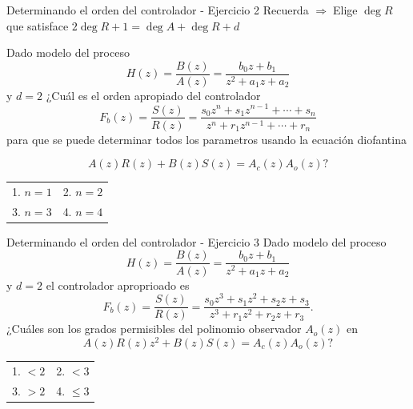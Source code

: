 \documentclass[presentation,aspectratio=169]{beamer}
\begin{document}
\begin{frame}[label={sec:orgabaf6a2}]{Determinando el orden del controlador - Ejercicio 2}
Recuerda    \alert{\(\Rightarrow\;\)Elige \(\deg R\) que satisface \(2\deg R + 1 = \deg A + \deg R + d\)}

   Dado modelo del proceso \[H(z) = \frac{B(z)}{A(z)} = \frac{b_0z + b_1}{z^2 + a_1z + a_2}\] y \(d=2\)  ¿Cuál es el orden apropiado del controlador 
\[F_b(z) = \frac{S(z)}{R(z)} = \frac{s_0z^n + s_1z^{n-1} + \cdots + s_n}{z^n + r_1 z^{n-1} + \cdots + r_n}\]
para que se puede determinar todos los parametros usando la ecuación diofantina

\[ A(z)R(z) + B(z)S(z) = A_c(z)A_o(z)?\]

\begin{center}
\begin{tabular}{ll}
1. \(n = 1\) & 2. \(n = 2\)\\
3. \(n=3\) & 4. \(n=4\)\\
\end{tabular}
\end{center}
\end{frame}

\begin{frame}[label={sec:org73ebcfa}]{Determinando el orden del controlador - Ejercicio 3}
   Dado modelo del proceso \[H(z) = \frac{B(z)}{A(z)} = \frac{b_0z + b_1}{z^2 + a_1z + a_2}\] y \(d=2\)   el controlador aproprioado es 
\[F_b(z) = \frac{S(z)}{R(z)} = \frac{s_0z^3 + s_1z^2 + s_2z + s_3}{z^3 + r_1 z^2 + r_2z + r_3}.\]
¿Cuáles son los grados permisibles del polinomio observador \(A_o(z)\) en
   \[ A(z)R(z)z^2 + B(z)S(z) = A_c(z)A_o(z)?\]

\begin{center}
\begin{tabular}{ll}
1. \(< 2\) & 2. \(< 3\)\\
3. \(> 2\) & 4. \(\le 3\)\\
\end{tabular}
\end{center}
\end{frame}
\end{document}
